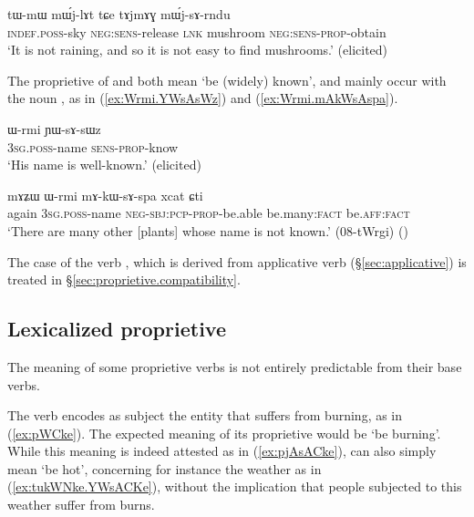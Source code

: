 \begin{exe}
\ex \label{ex:tAjmAG.mWjsArndu}
\gll tɯ-mɯ mɯ́j-lɤt tɕe tɤjmɤɣ mɯ́j-sɤ-rndu \\
\textsc{indef}.\textsc{poss}-sky \textsc{neg}:\textsc{sens}-release \textsc{lnk} mushroom \textsc{neg}:\textsc{sens}-\textsc{prop}-obtain \\
\glt `It is not raining, and so it is not easy to find mushrooms.' (elicited)
\end{exe}

The proprietive of  and  both mean `be (widely) known', and mainly occur with the noun , as in (\ref{ex:Wrmi.YWsAsWz}) and (\ref{ex:Wrmi.mAkWsAspa}).

\begin{exe}
\ex \label{ex:Wrmi.YWsAsWz}
\gll ɯ-rmi ɲɯ-sɤ-sɯz \\
\textsc{3sg}.\textsc{poss}-name \textsc{sens}-\textsc{prop}-know \\
\glt `His name is well-known.' (elicited)
\end{exe}

\begin{exe}
\ex \label{ex:Wrmi.mAkWsAspa}
\gll mɤʑɯ ɯ-rmi mɤ-kɯ-sɤ-spa xcat ɕti \\
again \textsc{3sg}.\textsc{poss}-name \textsc{neg}-\textsc{sbj}:\textsc{pcp}-\textsc{prop}-be.able be.many:\textsc{fact} be.\textsc{aff}:\textsc{fact} \\
\glt `There are many other [plants] whose name is not known.' (08-tWrgi) ()
\end{exe}
 
The case of the verb , which is derived from applicative verb  (§\ref{sec:applicative}) is treated in §\ref{sec:proprietive.compatibility}.
  

\subsection{Lexicalized proprietive} \label{sec:proprietive.lexicalized}
The meaning of some proprietive verbs is not entirely predictable from their base verbs. 

The verb  encodes as subject the entity that suffers from burning, as in (\ref{ex:pWCke}). The expected meaning of its proprietive  would be `be burning'. While this meaning is indeed attested as in (\ref{ex:pjAsACke}),  can also simply mean `be hot', concerning for instance the weather as in (\ref{ex:tukWNke.YWsACKe}), without the implication that people subjected to this weather suffer from burns.

